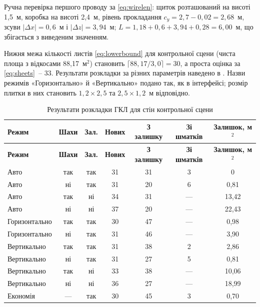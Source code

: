 Ручна перевірка першого проводу за \eqref{eq:wirelen}: щиток розташований на висоті 1,5~м, коробка на висоті 2,4~м, рівень прокладання $c_y=2{,}7-0{,}02=2{,}68$~м, зсуви $|\Delta x|=0{,}6$~м і $|\Delta z|=3{,}94$~м; $L=1{,}18+0{,}6+3{,}94+0{,}28=6{,}00$~м, що збігається з виведеним значенням.


Нижня межа кількості листів \eqref{eq:lowerbound} для контрольної сцени (чиста площа з відкосами 88,17~м$^2$) становить $\lceil 88{,}17/3{,}0\rceil=30$, а проста оцінка за \eqref{eq:sheets}~-- 33. Результати розкладки за різних параметрів наведено в . Назви режимів «Горизонтально» й «Вертикально» подано так, як в інтерфейсі; розмір плитки в них становить $1{,}2\times2{,}5$ та $2{,}5\times1{,}2$~м відповідно.

\begin{spacing}{1.15}
\small\noindent
\begin{xltabular}{\textwidth}{| >{\raggedright\arraybackslash}X | c | c | c | c | c | c |}
    \caption{Результати розкладки ГКЛ для стін контрольної сцени} \label{tab:dwmodes} \\
    \hline
    \textbf{Режим} & \textbf{Шахи} & \textbf{Зал.} & \textbf{Нових} & \textbf{З залишку} & \textbf{Зі шматків} & \textbf{Залишок, м$^2$} \\ \hline
    \endfirsthead

    \hline
    \textbf{Режим} & \textbf{Шахи} & \textbf{Зал.} & \textbf{Нових} & \textbf{З залишку} & \textbf{Зі шматків} & \textbf{Залишок, м$^2$} \\ \hline
    \endhead

    Авто & так & так & 31 & 31 & 3 & 0 \\ \hline
    Авто & ні & так & 31 & 20 & 6 & 0,81 \\ \hline
    Авто & так & ні & 34 & 31 & --- & 13,42 \\ \hline
    Авто & ні & ні & 37 & 20 & --- & 22,43 \\ \hline
    Горизонтально & так & так & 30 & 47 & --- & 0,98 \\ \hline
    Горизонтально & ні & так & 31 & 46 & --- & 3,90 \\ \hline
    Вертикально & так & так & 31 & 38 & 2 & 2,86 \\ \hline
    Вертикально & ні & так & 31 & 27 & 5 & 0,81 \\ \hline
    Вертикально & так & ні & 33 & 38 & --- & 10,06 \\ \hline
    Вертикально & ні & ні & 36 & 27 & --- & 18,99 \\ \hline
    Економія & --- & так & 30 & 45 & 3 & 0,70 \\ \hline
\end{xltabular}
\end{spacing}

